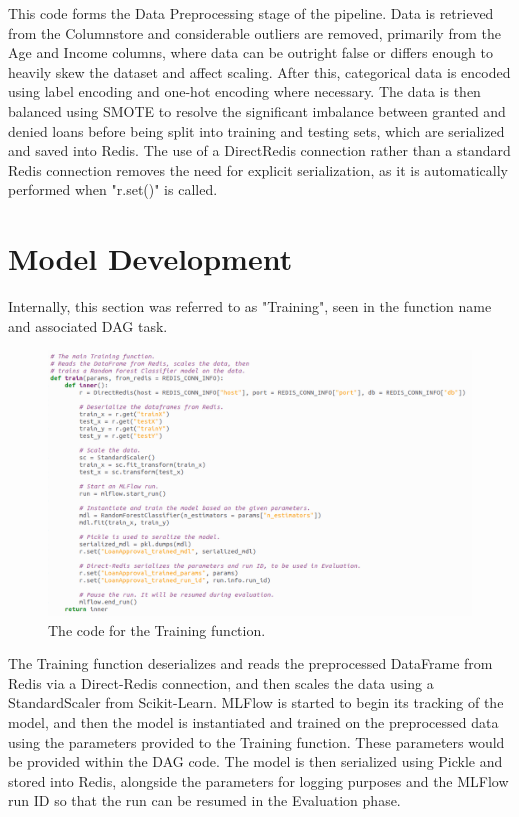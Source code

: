 \documentclass[12pt]{report}
\newcommand{\para}{\vspace{7pt}\noindent}
\begin{document}
\para This code forms the Data Preprocessing stage of the pipeline. Data is retrieved from the 
Columnstore and considerable outliers are removed, primarily from the Age and Income columns, 
where data can be outright false or differs enough to heavily skew the dataset and affect scaling.
After this, categorical data is encoded using label encoding and one-hot encoding where necessary.
The data is then balanced using SMOTE to resolve the significant imbalance between granted and denied loans 
before being split into training and testing sets, which are serialized and saved into Redis. The use of 
a DirectRedis connection rather than a standard Redis connection removes the need for explicit serialization, 
as it is automatically performed when "r.set()" is called. 

\section{Model Development}\label{sec:ImpDevelopment}
Internally, this section was referred to as "Training", seen in the function name and associated 
DAG task.

\begin{figure}[H]
    \centering
    \includegraphics[width=\linewidth]{Implementation/.Code/PipelineFunctions/Training.png}
    \caption{The code for the Training function.}
    \label{fig:TrainingCode}
\end{figure}

The Training function deserializes and reads the preprocessed DataFrame from Redis via a Direct-Redis 
connection, and then scales the data using a StandardScaler from Scikit-Learn. MLFlow is started 
to begin its tracking of the model, and then the model is instantiated and trained on the preprocessed data 
using the parameters provided to the Training function. These parameters would be provided within the DAG code.
The model is then serialized using Pickle and stored into Redis, alongside the parameters for logging purposes 
and the MLFlow run ID so that the run can be resumed in the Evaluation phase.
\end{document}
